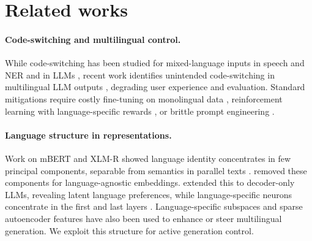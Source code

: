 \section{Related works}

\label{sec:related}

\paragraph{Code-switching and multilingual control.}
While code-switching has been studied for mixed-language inputs in speech and NER \citep{aguilar-etal-2020-lince, bali-etal-2014-borrowing} and in LLMs \citep{zhang-etal-2023-multilingual},
recent work identifies unintended code-switching in multilingual LLM outputs \citep{ryan-etal-2024-unintended, yoo2025codeswitchingredteamingllmevaluation},
degrading user experience and evaluation.
Standard mitigations require costly fine-tuning on monolingual data \citep{marchisio-etal-2024-understanding}, reinforcement learning with language-specific rewards \citep{Guo_2025}, or brittle prompt engineering \citep{marchisio-etal-2024-understanding}.

\paragraph{Language structure in representations.}
Work on mBERT and XLM-R showed language identity concentrates in few principal components, separable from semantics in parallel texts \citep{conneau-etal-2020-emerging, chi-etal-2020-finding, libovicky-etal-2020-language}.
\citet{yang-etal-2021-simple} removed these components for language-agnostic embeddings.
\citet{wendler-etal-2024-llamas} extended this to decoder-only LLMs, revealing latent language preferences, while language-specific neurons concentrate in the first and last layers \citep{tang-etal-2024-language, kojima-etal-2024-multilingual, zhao2024largelanguagemodelshandle}.
Language-specific subspaces \citep{zhao2025lensrethinkingmultilingualenhancement} and sparse autoencoder features \citep{deng-etal-2025-unveiling} have also been used to enhance or steer multilingual generation.
We exploit this structure for active generation control.

